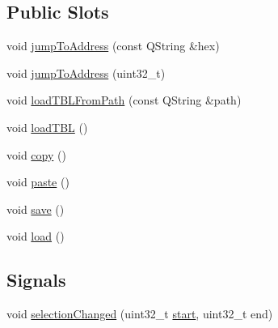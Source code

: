 \subsection*{Public Slots}
\begin{DoxyCompactItemize}
\item 
void \mbox{\hyperlink{class_q_g_b_a_1_1_memory_model_a212c953c6a7e14a707bef9017982cea8}{jump\+To\+Address}} (const Q\+String \&hex)
\item 
void \mbox{\hyperlink{class_q_g_b_a_1_1_memory_model_ad2400bd156a1b4b5f7f275a884ec0f67}{jump\+To\+Address}} (uint32\+\_\+t)
\item 
void \mbox{\hyperlink{class_q_g_b_a_1_1_memory_model_aed4e9c661e52c82ddc958b8d6a457248}{load\+T\+B\+L\+From\+Path}} (const Q\+String \&path)
\item 
void \mbox{\hyperlink{class_q_g_b_a_1_1_memory_model_a39b4c0fbfcdf26243af77bed0223c811}{load\+T\+BL}} ()
\item 
void \mbox{\hyperlink{class_q_g_b_a_1_1_memory_model_a70a88aa956fa14bd0a6f4cec769f7bb3}{copy}} ()
\item 
void \mbox{\hyperlink{class_q_g_b_a_1_1_memory_model_a9160c33072a3eb745beb90c39cf1d01b}{paste}} ()
\item 
void \mbox{\hyperlink{class_q_g_b_a_1_1_memory_model_afa1d14d0c9d9fbac5d54d5808b75ca11}{save}} ()
\item 
void \mbox{\hyperlink{class_q_g_b_a_1_1_memory_model_a0bb208ac899a5d6114c24bf2dcd73955}{load}} ()
\end{DoxyCompactItemize}
\subsection*{Signals}
\begin{DoxyCompactItemize}
\item 
void \mbox{\hyperlink{class_q_g_b_a_1_1_memory_model_a0fa24be2f52e936661ef0923c4ed77f5}{selection\+Changed}} (uint32\+\_\+t \mbox{\hyperlink{tarith_8c_a7b8af9b9d992acd1d81caf9bb377f6c2a0e97c69c73117f6c0109b2d7d1d9cedc}{start}}, uint32\+\_\+t end)
\end{DoxyCompactItemize}
